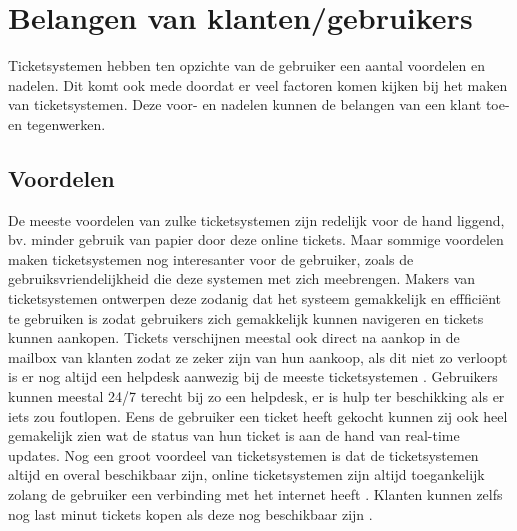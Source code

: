 
\section{Belangen van klanten/gebruikers}
Ticketsystemen hebben ten opzichte van de gebruiker een aantal voordelen en nadelen. Dit komt ook mede doordat er veel factoren komen kijken bij het maken van ticketsystemen. 
Deze voor- en nadelen kunnen de belangen van een klant toe- en tegenwerken.

\subsection{Voordelen}
De meeste voordelen van zulke ticketsystemen zijn redelijk voor de hand liggend, bv. minder gebruik van papier door deze online tickets.
Maar sommige voordelen maken ticketsystemen nog interesanter voor de gebruiker, zoals de gebruiksvriendelijkheid die deze systemen met zich meebrengen.
Makers van ticketsystemen ontwerpen deze zodanig dat het systeem gemakkelijk en effficiënt te gebruiken is zodat gebruikers zich gemakkelijk kunnen navigeren en tickets kunnen aankopen.
Tickets verschijnen meestal ook direct na aankop in de mailbox van klanten zodat ze zeker zijn van hun aankoop, als dit niet zo verloopt is er nog 
altijd een helpdesk aanwezig bij de meeste ticketsystemen \cite{cm-voordelen}. Gebruikers kunnen meestal 24/7 terecht bij zo een helpdesk, er is hulp ter beschikking als er iets zou foutlopen.
Eens de gebruiker een ticket heeft gekocht kunnen zij ook heel gemakelijk zien wat de status van hun ticket is aan de hand van real-time updates.
Nog een groot voordeel van ticketsystemen is dat de ticketsystemen altijd en overal beschikbaar zijn, online ticketsystemen zijn altijd toegankelijk zolang de gebruiker een verbinding met het internet heeft \cite{Benefitsonline2023}.
Klanten kunnen zelfs nog last minut tickets kopen als deze nog beschikbaar zijn \cite{cm-voordelen}.


